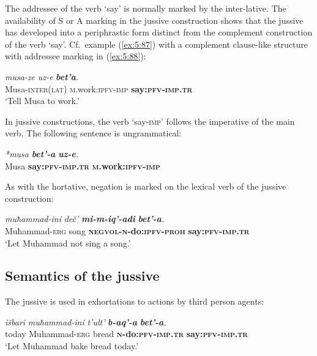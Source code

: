 ﻿\documentclass[output=paper]{langsci/langscibook}
\begin{document}
The addressee of the verb `say' is normally marked by the inter-lative. The
availability of S or A marking in the jussive construction shows that
the jussive has developed into a periphrastic form distinct from the
complement construction of the verb `say'. Cf.\ example (\ref{ex:5:87}) with a
complement clause-like structure with addressee marking in (\ref{ex:5:88}):

\ea \label{ex:5:88} %
\gll \emph{musa-ze } \emph{uz-e }  \emph{\textbf{bet'a}.}\\
 Musa-\textsc{inter}(\textsc{lat}) \textsc{m}.work:\textsc{ipfv}-\textsc{imp} \textbf{say:\textsc{pfv}-\textsc{imp}.\textsc{tr}}\\
\glt `Tell Musa to work.'
\z

In jussive constructions, the verb `say-\textsc{imp}' follows the imperative of
the main verb. The following sentence is ungrammatical:

\ea %
\gll \emph{*musa} \emph{\textbf{bet'-a}} \emph{\textbf{uz-e}.}\\
 Musa \textbf{say:\textsc{pfv}-\textsc{imp}.\textsc{tr}} \textbf{\textsc{m}.work:\textsc{ipfv}-\textsc{imp}}\\
 \z
 
As with the hortative, negation is marked on the lexical verb of the jussive
construction:

\ea %
\gll \emph{muħammad-ini} \emph{deč'} \emph{\textbf{mi-m-iq'-adi}} \emph{\textbf{bet'-a}.}\\
 Muħammad-\textsc{erg} song \textbf{\textsc{negvol}-\textsc{n}-do:\textsc{ipfv}-\textsc{proh}} \textbf{say:\textsc{pfv}-\textsc{imp}.\textsc{tr}}\\
\glt `Let Muhammad not sing a song.'
\z

\subsection{Semantics of the jussive}\label{semantics-of-the-jussive}

The jussive is used in exhortations to actions by third person agents:

\ea %
\gll \emph{išbari} \emph{muħammad-ini} \emph{t'ult'} \emph{\textbf{b-aq'-a}} \emph{\textbf{bet'-a}.}\\
today Muhammad-\textsc{erg} bread \textbf{\textsc{n}-do:\textsc{pfv}-\textsc{imp}.\textsc{tr}} \textbf{say:\textsc{pfv}-\textsc{imp}.\textsc{tr}}\\
\glt `Let Muhammad bake bread today.'
\z
\end{document}
